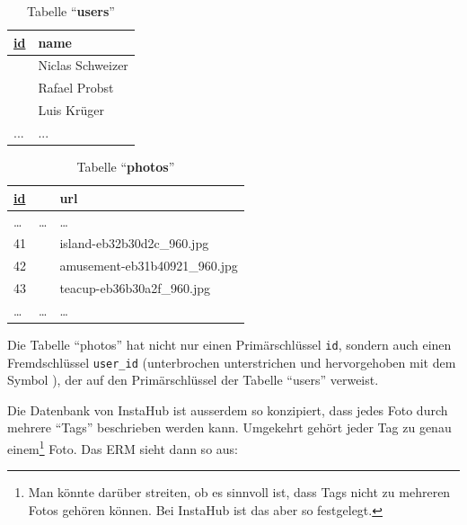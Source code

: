 \begin{minipage}{.38\textwidth}
\centering

\begin{table}[H]
\centering
\begin{tabular}{a|l}
   \underline{id} & name    \\\midrule
{}  & Niclas Schweizer    \\
  & Rafael Probst   \\
  & Luis Krüger  \\
... & ...
\end{tabular}
\caption{Tabelle \enquote{\textbf{users}}}
\label{table:users-2}
\end{table}
\end{minipage}
\begin{minipage}{.58\textwidth}
\centering
\begin{table}[H]
\centering
\begin{tabular}{a|l|l}
   \underline{id} & & url \\\midrule
  \dots & \dots & \dots \\
41 &    & island-eb32b30d2c\_960.jpg   \\
42&    & amusement-eb31b40921\_960.jpg    \\
43&     & teacup-eb36b30a2f\_960.jpg  \\
\dots & \dots& \dots
\end{tabular}
\caption{Tabelle \enquote{\textbf{photos}}}
\label{table:photos-2}
\end{table}
\end{minipage}

Die Tabelle \enquote{photos} hat nicht nur einen Primärschlüssel \texttt{id}, sondern auch einen Fremdschlüssel \texttt{user\_id} (unterbrochen unterstrichen und hervorgehoben mit dem Symbol \faKey), der auf den Primärschlüssel der Tabelle \enquote{users} verweist.

Die Datenbank von InstaHub ist ausserdem so konzipiert, dass jedes Foto durch mehrere \enquote{Tags} beschrieben werden kann. Umgekehrt gehört jeder Tag zu genau einem\footnote{Man könnte darüber streiten, ob es sinnvoll ist, dass Tags nicht zu mehreren Fotos gehören können. Bei InstaHub ist das aber so festgelegt.} Foto. Das ERM sieht dann so aus:

